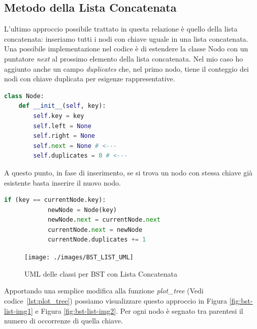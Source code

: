 \documentclass{article}
\begin{document}
\subsection{Metodo della Lista Concatenata}
\label{subsec:list-implementation}



L'ultimo approccio possibile trattato in questa relazione è quello  della lista concatenata: inseriamo tutti i nodi con chiave uguale in una lista concatenata.
Una possibile implementazione nel codice è di estendere la classe Nodo con un puntatore \textit{next} al prossimo elemento della lista concatenata. Nel mio caso ho aggiunto anche un campo   \textit{duplicates} che, nel primo nodo, tiene il conteggio dei nodi con chiave duplicata per esigenze rappresentative.

\begin{lstlisting}[language=Python, caption={Classe Nodo di un BST con lista concatenata}]
class Node:
    def __init__(self, key):
        self.key = key
        self.left = None
        self.right = None
        self.next = None # <---
        self.duplicates = 0 # <---
\end{lstlisting}

A questo punto, in fase di inserimento, se si trova un nodo con stessa chiave già esistente basta inserire il nuovo nodo.

\begin{lstlisting}[language=Python, caption={Gestione chiavi duplicate con lista concatenata}]
     if (key == currentNode.key):
            newNode = Node(key)
            newNode.next = currentNode.next
            currentNode.next = newNode
            currentNode.duplicates += 1

\end{lstlisting}

\vspace{15px}


\begin{figure}[H]
  \centering
  \texttt{[image: ./images/BST\_LIST\_UML]}
    \caption{UML delle classi per BST con Lista Concatenata}
  \label{fig:BST_LIST_UML}
\end{figure}

\vspace{15px}

Apportando una semplice modifica alla funzione \textit{plot\_tree} (Vedi codice~\ref{lst:plot_tree}) possiamo visualizzare questo approccio in Figura \ref{fig:bst-list-img1} e Figura \ref{fig:bst-list-img2}.
Per ogni nodo è segnato tra parentesi il numero di occorrenze di quella chiave.
\end{document}
